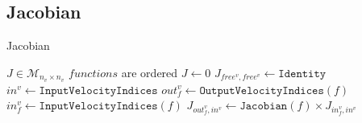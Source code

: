 \documentclass {article}
\begin{document}
\subsection{Jacobian}

\begin{algorithm}
  \caption{Jacobian}
  \begin{algorithmic}
    \REQUIRE $ J \in \mathcal{M}_{n_v \times n_v} $
    \REQUIRE $ functions $ are ordered
    \STATE $ J \gets 0 $
    \STATE $ J_{free^v,free^v} \gets \texttt{Identity} $
    \STATE $ in^v  \gets \texttt{InputVelocityIndices} $
      \STATE $ out^v_f \gets \texttt{OutputVelocityIndices}(f)$
      \STATE $ in^v_f  \gets \texttt{InputVelocityIndices}(f)$
      \STATE $ J_{out^v_f,in^v} \gets \texttt{Jacobian}(f) \times J_{in^v_f,in^v} $
    \ENDFOR
  \end{algorithmic}
\end{algorithm}
\end{document}
